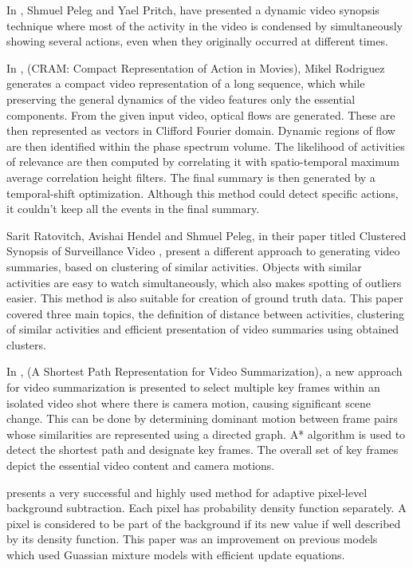 In \cite{pritch2008nonchronological}, Shmuel Peleg and Yael Pritch, have presented a dynamic video synopsis technique where most of the activity in the video is condensed by simultaneously showing several actions, even when they originally occurred at different times.

In \cite{rodriguez2010cram}, (CRAM: Compact Representation of Action in Movies), Mikel Rodriguez generates a compact video representation of a long sequence, which while preserving the general dynamics of the video features only the essential components. From the given input video, optical flows are generated. These are then represented as vectors in Clifford Fourier domain. Dynamic regions of flow are then identified within the phase spectrum volume. The likelihood of activities of relevance are then computed by correlating it with spatio-temporal maximum average correlation height filters. The final summary is then generated by a temporal-shift optimization. Although this method could detect specific actions, it couldn’t keep all the events in the final summary.

Sarit Ratovitch, Avishai Hendel and Shmuel Peleg, in their paper titled Clustered Synopsis of Surveillance Video \cite{pritch2009clustered}, present a different approach to generating video summaries, based on clustering of similar activities. Objects with similar activities are easy to watch simultaneously, which also makes spotting of outliers easier. This method is also suitable for creation of ground truth data. This paper covered three main topics, the definition of distance between activities, clustering of similar activities and efficient presentation of video summaries using obtained clusters.

In \cite{porter2003shortest}, (A Shortest Path Representation for Video Summarization), a new approach for video summarization is presented to select multiple key frames within an isolated video shot where there is camera motion, causing significant scene change. This can be done by determining dominant motion between frame pairs whose similarities are represented using a directed graph. A* algorithm is used to detect the shortest path and designate key frames. The overall set of key frames depict the essential video content and camera motions.

\cite{zivkovic2004improved} presents a very successful and highly used method for adaptive pixel-level background subtraction. Each pixel has probability density function separately. A pixel is considered to be part of the background if its new value if well described by its density function. This paper was an improvement on previous models which used Guassian mixture models with efficient update equations.

